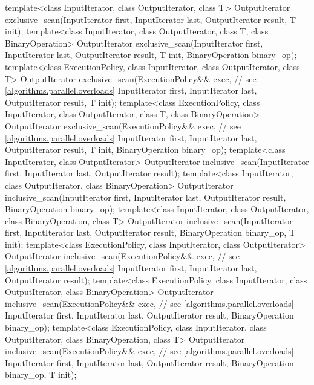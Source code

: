 \begin{codeblock}
{  template<class InputIterator, class OutputIterator, class T>
    OutputIterator exclusive_scan(InputIterator first, InputIterator last,
                                  OutputIterator result,
                                  T init);
  template<class InputIterator, class OutputIterator, class T, class BinaryOperation>
    OutputIterator exclusive_scan(InputIterator first, InputIterator last,
                                  OutputIterator result,
                                  T init, BinaryOperation binary_op);
  template<class ExecutionPolicy, class InputIterator, class OutputIterator, class T>
    OutputIterator exclusive_scan(ExecutionPolicy&& exec, // see \ref{algorithms.parallel.overloads}
                                  InputIterator first, InputIterator last,
                                  OutputIterator result,
                                  T init);
  template<class ExecutionPolicy, class InputIterator, class OutputIterator, class T,
           class BinaryOperation>
    OutputIterator exclusive_scan(ExecutionPolicy&& exec, // see \ref{algorithms.parallel.overloads}
                                  InputIterator first, InputIterator last,
                                  OutputIterator result,
                                  T init, BinaryOperation binary_op);
  template<class InputIterator, class OutputIterator>
    OutputIterator inclusive_scan(InputIterator first, InputIterator last,
                                  OutputIterator result);
  template<class InputIterator, class OutputIterator, class BinaryOperation>
    OutputIterator inclusive_scan(InputIterator first, InputIterator last,
                                  OutputIterator result,
                                  BinaryOperation binary_op);
  template<class InputIterator, class OutputIterator, class BinaryOperation, class T>
    OutputIterator inclusive_scan(InputIterator first, InputIterator last,
                                  OutputIterator result,
                                  BinaryOperation binary_op, T init);
  template<class ExecutionPolicy, class InputIterator, class OutputIterator>
    OutputIterator inclusive_scan(ExecutionPolicy&& exec, // see \ref{algorithms.parallel.overloads}
                                  InputIterator first, InputIterator last,
                                  OutputIterator result);
  template<class ExecutionPolicy, class InputIterator, class OutputIterator,
           class BinaryOperation>
    OutputIterator inclusive_scan(ExecutionPolicy&& exec, // see \ref{algorithms.parallel.overloads}
                                  InputIterator first, InputIterator last,
                                  OutputIterator result,
                                  BinaryOperation binary_op);
  template<class ExecutionPolicy, class InputIterator, class OutputIterator,
           class BinaryOperation, class T>
    OutputIterator inclusive_scan(ExecutionPolicy&& exec, // see \ref{algorithms.parallel.overloads}
                                  InputIterator first, InputIterator last,
                                  OutputIterator result,
                                  BinaryOperation binary_op, T init);

}
\end{codeblock}
